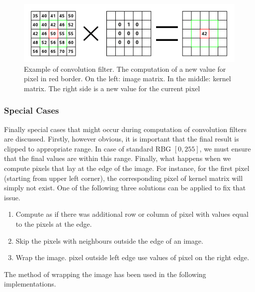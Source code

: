 \documentclass{article}
\begin{document}
%
%
\begin{figure}[H]
\centering

  \includegraphics[width=0.9\linewidth]{res/convo.png}
  
\caption{Example of convolution filter. The computation of a new value for pixel in red border. On the left: image matrix. In the middle: kernel matrix. The right side is a new value for the current pixel}
\label{fig:convo}
\end{figure}

\subsubsection{Special Cases}


Finally special cases that might occur during computation of convolution filters are discussed. Firstly, however obvious, it is important that the final result is clipped to appropriate range. In case of standard RBG $[0 ,255]$, we must ensure that the final values are within this range. Finally, what happens when we compute pixels that lay at the edge of the image. For instance, for the first pixel (starting from upper left corner), the corresponding pixel of kernel matrix will simply not exist. One of the following three solutions can be applied to fix that issue.
\begin{enumerate}
	\item Compute as if there was additional row or column of pixel with values equal to the pixels at the edge.
	\item Skip the pixels with neighbours outside the edge of an image.
	\item Wrap the image. pixel outside left edge use values of pixel on the right edge.
\end{enumerate}

The method of wrapping the image has been used in the following implementations.

\end{document}
